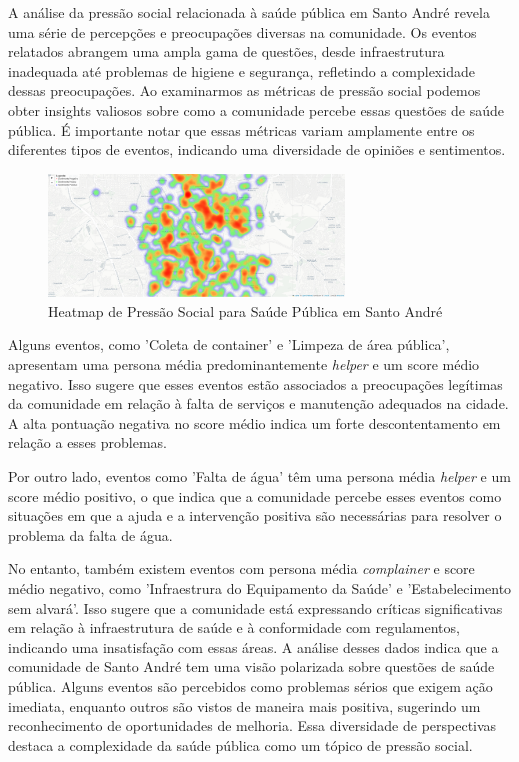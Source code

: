 A análise da pressão social relacionada à saúde pública em Santo André revela uma série de percepções e preocupações diversas na comunidade. Os eventos relatados abrangem uma ampla gama de questões, desde infraestrutura inadequada até problemas de higiene e segurança, refletindo a complexidade dessas preocupações. Ao examinarmos as métricas de pressão social podemos obter insights valiosos sobre como a comunidade percebe essas questões de saúde pública. É importante notar que essas métricas variam amplamente entre os diferentes tipos de eventos, indicando uma diversidade de opiniões e sentimentos.

\begin{figure}[htb]
	\centering
	\includegraphics[width=0.7\textwidth]{images/heatmap_santo_andre.PNG}
	\caption{Heatmap de Pressão Social para Saúde Pública em Santo André}
	\label{fig:heatmap_santo_andre}
\end{figure}

Alguns eventos, como 'Coleta de container' e 'Limpeza de área pública', apresentam uma persona média predominantemente \textit{helper} e um score médio negativo. Isso sugere que esses eventos estão associados a preocupações legítimas da comunidade em relação à falta de serviços e manutenção adequados na cidade. A alta pontuação negativa no score médio indica um forte descontentamento em relação a esses problemas.

Por outro lado, eventos como 'Falta de água' têm uma persona média \textit{helper} e um score médio positivo, o que indica que a comunidade percebe esses eventos como situações em que a ajuda e a intervenção positiva são necessárias para resolver o problema da falta de água.

No entanto, também existem eventos com persona média \textit{complainer} e score médio negativo, como 'Infraestrura do Equipamento da Saúde' e 'Estabelecimento sem alvará'. Isso sugere que a comunidade está expressando críticas significativas em relação à infraestrutura de saúde e à conformidade com regulamentos, indicando uma insatisfação com essas áreas. A análise desses dados indica que a comunidade de Santo André tem uma visão polarizada sobre questões de saúde pública. Alguns eventos são percebidos como problemas sérios que exigem ação imediata, enquanto outros são vistos de maneira mais positiva, sugerindo um reconhecimento de oportunidades de melhoria. Essa diversidade de perspectivas destaca a complexidade da saúde pública como um tópico de pressão social.

